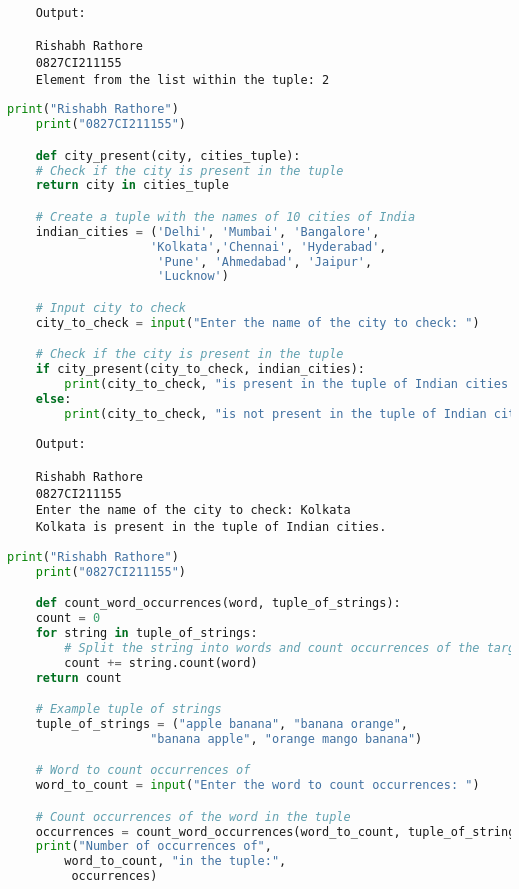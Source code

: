 \documentclass{report}
\begin{document}
\begin{verbatim}
	Output:

	Rishabh Rathore
	0827CI211155
	Element from the list within the tuple: 2

\end{verbatim}



\newpage

\sol 
\begin{lstlisting}[language=Python]
	print("Rishabh Rathore")
	print("0827CI211155")

	def city_present(city, cities_tuple):
    # Check if the city is present in the tuple
    return city in cities_tuple

	# Create a tuple with the names of 10 cities of India
	indian_cities = ('Delhi', 'Mumbai', 'Bangalore', 
					'Kolkata','Chennai', 'Hyderabad',
					 'Pune', 'Ahmedabad', 'Jaipur', 
					 'Lucknow')

	# Input city to check
	city_to_check = input("Enter the name of the city to check: ")

	# Check if the city is present in the tuple
	if city_present(city_to_check, indian_cities):
		print(city_to_check, "is present in the tuple of Indian cities.")
	else:
		print(city_to_check, "is not present in the tuple of Indian cities.")
\end{lstlisting}

\begin{verbatim}
	Output:

	Rishabh Rathore
	0827CI211155
	Enter the name of the city to check: Kolkata
	Kolkata is present in the tuple of Indian cities.

\end{verbatim}


\newpage

\sol 
\begin{lstlisting}[language=Python]
	print("Rishabh Rathore")
	print("0827CI211155")

	def count_word_occurrences(word, tuple_of_strings):
    count = 0
    for string in tuple_of_strings:
        # Split the string into words and count occurrences of the target word
        count += string.count(word)
    return count

	# Example tuple of strings
	tuple_of_strings = ("apple banana", "banana orange", 
					"banana apple", "orange mango banana")

	# Word to count occurrences of
	word_to_count = input("Enter the word to count occurrences: ")

	# Count occurrences of the word in the tuple
	occurrences = count_word_occurrences(word_to_count, tuple_of_strings)
	print("Number of occurrences of", 
		word_to_count, "in the tuple:",
		 occurrences)

\end{lstlisting}
\end{document}
